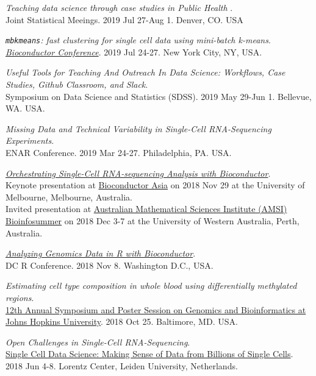 \documentclass[10pt]{article}
\begin{document}
\item 
{\it Teaching data science through case studies in Public Health }. \\
 Joint Statistical Meeings. 2019 Jul 27-Aug 1. Denver, CO. USA
\item 
{\it \texttt{mbkmeans}: fast clustering for single cell data using mini-batch k-means}. \\
\href{http://bioc2019.bioconductor.org}{{\it Bioconductor Conference}}. 2019 Jul 24-27. New York City, NY, USA.
\item 
{ \it Useful Tools for Teaching And Outreach In Data Science: Workflows, Case Studies, Github Classroom, and Slack}. \\ 
Symposium on Data Science and Statistics (SDSS). 2019 May 29-Jun 1. Bellevue, WA. USA.
\item 
{\it Missing Data and Technical Variability in Single-Cell RNA-Sequencing Experiments}. \\ 
ENAR Conference. 2019 Mar 24-27. Philadelphia, PA. USA.
\item 
{\it \href{https://speakerdeck.com/stephaniehicks/orchestrating-single-cell-rna-sequencing-analysis-with-bioconductor}{Orchestrating Single-Cell RNA-sequencing Analysis with Bioconductor}}. \\
Keynote presentation at \href{https://bioconductor.github.io/BiocAsia/}{Bioconductor Asia} on 2018 Nov 29 at the University of Melbourne, Melbourne, Australia.  \\
Invited presentation at \href{https://bis.amsi.org.au}{Australian Mathematical Sciences Institute (AMSI) Bioinfosummer} on 2018 Dec 3-7 at the University of Western Australia, Perth, Australia.
\item 
{\it \href{https://speakerdeck.com/stephaniehicks/analyzing-genomics-data-in-r-with-bioconductor}{Analyzing Genomics Data in R with Bioconductor}}. \\
DC R Conference. 2018 Nov 8. Washington D.C., USA.
\item 
{\it Estimating cell type composition in whole blood using differentially methylated regions}. \\
\href{http://genomics.jhu.edu/symposium.html}{12th Annual Symposium and Poster Session on Genomics and Bioinformatics at Johns Hopkins University}. 2018 Oct 25. Baltimore, MD. USA.
\item 
{\it Open Challenges in Single-Cell RNA-Sequencing}. \\ 
\href{http://lorentzcenter.nl/lc/web/2018/986/info.php3?wsid=986&venue=Oort}{Single Cell Data Science: Making Sense of Data from Billions of Single Cells}. 2018 Jun 4-8. Lorentz Center, Leiden University, Netherlands.
\end{document}
